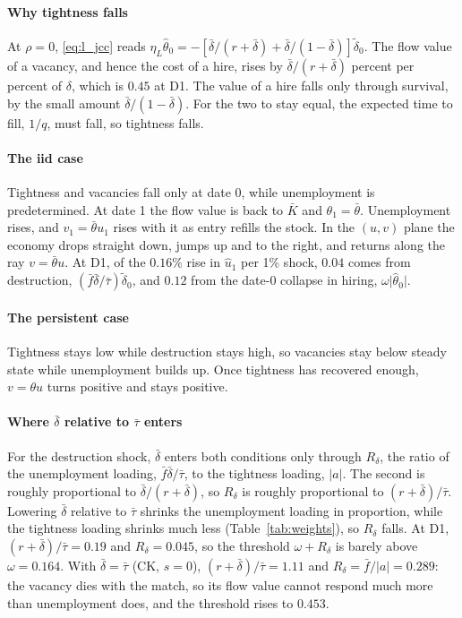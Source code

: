 \documentclass[authoryear, review, 12pt]{elsarticle}
\begin{document}
\paragraph{Why tightness falls}
At $\rho=0$, \eqref{eq:l_jcc} reads
$\eta_L\hat\theta_0=-[\bar\delta/(r+\bar\delta)+\bar\delta/(1-\bar\delta)]\tilde\delta_0$. The
flow value of a vacancy, and hence the cost of a hire, rises by $\bar\delta/(r+\bar\delta)$
percent per percent of $\delta$, which is $0.45$ at D1. The value of a hire falls only
through survival, by the small amount $\bar\delta/(1-\bar\delta)$. For the two to stay
equal, the expected time to fill, $1/q$, must fall, so tightness falls.

\paragraph{The iid case}
Tightness and vacancies fall only at date 0, while unemployment is predetermined. At date 1
the flow value is back to $\bar K$ and $\theta_1=\bar\theta$. Unemployment rises, and
$v_1=\bar\theta u_1$ rises with it as entry refills the stock. In the $(u,v)$ plane the
economy drops straight down, jumps up and to the right, and returns along the ray
$v=\bar\theta u$. At D1, of the $0.16\%$ rise in $\hat u_1$ per 1\% shock, $0.04$ comes from
destruction, $(\bar f\bar\delta/\bar\tau)\tilde\delta_0$, and $0.12$ from the date-0 collapse
in hiring, $\omega\lvert\hat\theta_0\rvert$.

\paragraph{The persistent case}
Tightness stays low while destruction stays high, so vacancies stay below steady state
while unemployment builds up. Once tightness has recovered enough, $v=\theta u$ turns
positive and stays positive.

\paragraph{Where $\bar\delta$ relative to $\bar\tau$ enters}
For the destruction shock, $\bar\delta$ enters both conditions only through $R_\delta$, the
ratio of the unemployment loading, $\bar f\bar\delta/\bar\tau$, to the tightness loading,
$\lvert a\rvert$. The second is roughly proportional to $\bar\delta/(r+\bar\delta)$, so
$R_\delta$ is roughly proportional to $(r+\bar\delta)/\bar\tau$. Lowering $\bar\delta$ relative
to $\bar\tau$ shrinks the unemployment loading in proportion, while the tightness loading
shrinks much less (Table~\ref{tab:weights}), so $R_\delta$ falls. At D1,
$(r+\bar\delta)/\bar\tau=0.19$ and $R_\delta=0.045$, so the threshold $\omega+R_\delta$ is
barely above $\omega=0.164$. With $\bar\delta=\bar\tau$ (CK, $s=0$),
$(r+\bar\delta)/\bar\tau=1.11$ and $R_\delta=\bar f/\lvert a\rvert=0.289$: the vacancy dies
with the match, so its flow value cannot respond much more than unemployment does, and the
threshold rises to $0.453$.
\end{document}
